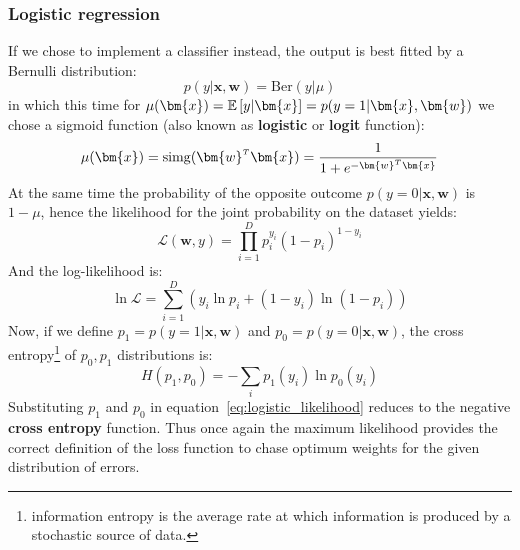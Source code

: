 

\subsubsection{Logistic regression}

If we chose to implement a classifier instead, the output is best fitted by a Bernulli distribution:
\begin{equation}
    p(y|\bm{x},\bm{w}) = \mathrm{Ber}(y|\mu)
\end{equation}
in which this time for $\mu(\bm{x}) = \expectation{y|\bm{x}} = p(y=1|\bm{x},\bm{w})$ we chose a sigmoid function (also known as \textbf{logistic} or \textbf{logit} function):
\begin{equation}
    \mu(\bm{x}) = \mathrm{simg}(\transpose{\bm{w}}\bm{x}) = \frac{1}{1+e^{-\transpose{\bm{w}}\bm{x}}}
\end{equation}
At the same time the probability of the opposite outcome $p(y=0|\bm{x},\bm{w})$ is $1-\mu$, hence the likelihood for the joint probability on the dataset yields:
\begin{equation}
    \mathcal{L}(\bm{w}, y) = \prod_{i=1}^D p_i^{y_i}(1-p_i)^{1-y_i}
\end{equation}
And the log-likelihood is:
\begin{equation}
    \ln\mathcal{L} = \sum_{i=1}^D (y_i \ln p_i + (1-y_i)\ln(1-p_i))
    \label{eq:logistic_likelihood}
\end{equation}
Now, if we define $p_1 = p(y=1|\bm{x},\bm{w})$ and $p_0 = p(y=0|\bm{x},\bm{w})$, the cross entropy\footnote{information entropy is the average rate at which information is produced by a stochastic source of data.} of $p_0,p_1$ distributions is:
\begin{equation}
    H(p_1,p_0) = - \sum_i p_1(y_i) \ln p_0(y_i)
\end{equation}
Substituting $p_1$ and $p_0$ in equation~\eqref{eq:logistic_likelihood} reduces to the negative \textbf{cross entropy} function. Thus once again the maximum likelihood provides the correct definition of the loss function to chase optimum weights for the given distribution of errors.


%
